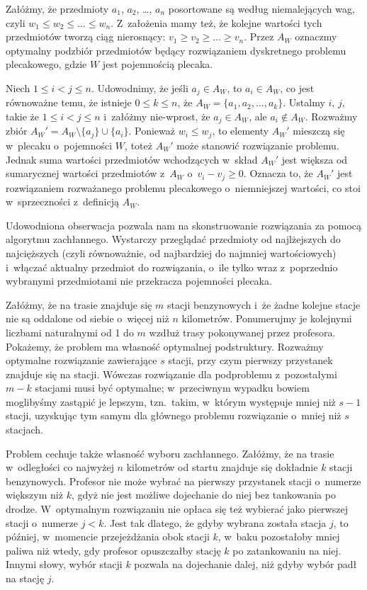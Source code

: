 \exercise %
Załóżmy, że przedmioty $a_1$, $a_2$, \dots, $a_n$ posortowane są według niemalejących wag, czyli $w_1\le w_2\le\dots\le w_n$.
Z~założenia mamy też, że kolejne wartości tych przedmiotów tworzą ciąg nierosnący: $v_1\ge v_2\ge\dots\ge v_n$.
Przez $A_W$ oznaczmy optymalny podzbiór przedmiotów będący rozwiązaniem dyskretnego problemu plecakowego, gdzie $W$ jest pojemnością plecaka.

Niech $1\le i<j\le n$.
Udowodnimy, że jeśli $a_j\in A_W$, to $a_i\in A_W$, co jest równoważne temu, że istnieje $0\le k\le n$, że $A_W=\{a_1,a_2,\dots,a_k\}$.
Ustalmy $i$, $j$, takie że $1\le i<j\le n$ i~załóżmy nie-wprost, że $a_j\in A_W$, ale $a_i\not\in A_W$.
Rozważmy zbiór $A_W'=A_W\setminus\{a_j\}\cup\{a_i\}$.
Ponieważ $w_i\le w_j$, to elementy $A_W'$ mieszczą się w~plecaku o~pojemności $W$, toteż $A_W'$ może stanowić rozwiązanie problemu.
Jednak suma wartości przedmiotów wchodzących w~skład $A_W'$ jest większa od sumarycznej wartości przedmiotów z~$A_W$ o~$v_i-v_j\ge0$.
Oznacza to, że $A_W'$ jest rozwiązaniem rozważanego problemu plecakowego o~niemniejszej wartości, co stoi w~sprzeczności z~definicją $A_W$.

Udowodniona obserwacja pozwala nam na skonstruowanie rozwiązania za pomocą algorytmu zachłannego.
Wystarczy przeglądać przedmioty od najlżejszych do najcięższych (czyli równoważnie, od najbardziej do najmniej wartościowych) i~włączać aktualny przedmiot do rozwiązania, o~ile tylko wraz z~poprzednio wybranymi przedmiotami nie przekracza pojemności plecaka.

\exercise %
Załóżmy, że na trasie znajduje się $m$ stacji benzynowych i~że żadne kolejne stacje nie są oddalone od siebie o~więcej niż $n$ kilometrów.
Ponumerujmy je kolejnymi liczbami naturalnymi od 1 do $m$ wzdłuż trasy pokonywanej przez profesora.
Pokażemy, że problem ma własność optymalnej podstruktury.
Rozważmy optymalne rozwiązanie zawierające $s$ stacji, przy czym pierwszy przystanek znajduje się na  stacji.
Wówczas rozwiązanie dla podproblemu z~pozostałymi $m-k$ stacjami musi być optymalne; w~przeciwnym wypadku bowiem moglibyśmy zastąpić je lepszym, tzn.\ takim, w~którym występuje mniej niż $s-1$ stacji, uzyskując tym samym dla głównego problemu rozwiązanie o~mniej niż $s$ stacjach.

Problem cechuje także własność wyboru zachłannego.
Załóżmy, że na trasie w~odległości co najwyżej $n$ kilometrów od startu znajduje się dokładnie $k$ stacji benzynowych.
Profesor nie może wybrać na pierwszy przystanek stacji o~numerze większym niż $k$, gdyż nie jest możliwe dojechanie do niej bez tankowania po drodze.
W~optymalnym rozwiązaniu nie opłaca się też wybierać jako pierwszej stacji o~numerze $j<k$.
Jest tak dlatego, że gdyby wybrana została stacja $j$, to później, w~momencie przejeżdżania obok stacji $k$, w~baku pozostałoby mniej paliwa niż wtedy, gdy profesor opuszczałby stację $k$ po zatankowaniu na niej.
Innymi słowy, wybór stacji $k$ pozwala na dojechanie dalej, niż gdyby wybór padł na stację $j$.

